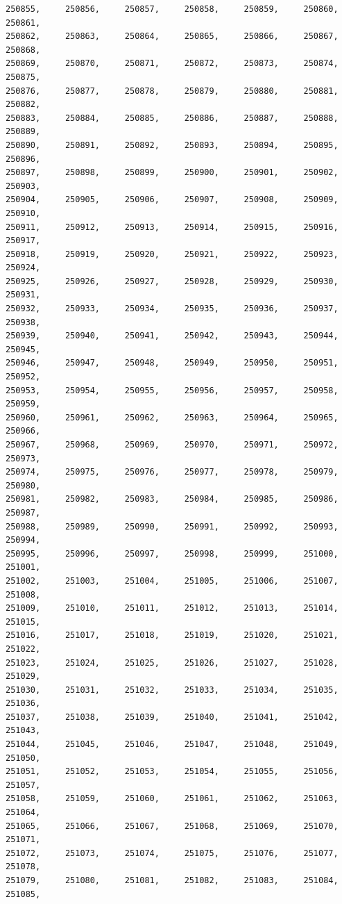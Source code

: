 \documentclass[a4paper,11pt]{report}
\begin{document}
\begin{verbatim}
250855,     250856,     250857,     250858,     250859,     250860,     250861,
250862,     250863,     250864,     250865,     250866,     250867,     250868,
250869,     250870,     250871,     250872,     250873,     250874,     250875,
250876,     250877,     250878,     250879,     250880,     250881,     250882,
250883,     250884,     250885,     250886,     250887,     250888,     250889,
250890,     250891,     250892,     250893,     250894,     250895,     250896,
250897,     250898,     250899,     250900,     250901,     250902,     250903,
250904,     250905,     250906,     250907,     250908,     250909,     250910,
250911,     250912,     250913,     250914,     250915,     250916,     250917,
250918,     250919,     250920,     250921,     250922,     250923,     250924,
250925,     250926,     250927,     250928,     250929,     250930,     250931,
250932,     250933,     250934,     250935,     250936,     250937,     250938,
250939,     250940,     250941,     250942,     250943,     250944,     250945,
250946,     250947,     250948,     250949,     250950,     250951,     250952,
250953,     250954,     250955,     250956,     250957,     250958,     250959,
250960,     250961,     250962,     250963,     250964,     250965,     250966,
250967,     250968,     250969,     250970,     250971,     250972,     250973,
250974,     250975,     250976,     250977,     250978,     250979,     250980,
250981,     250982,     250983,     250984,     250985,     250986,     250987,
250988,     250989,     250990,     250991,     250992,     250993,     250994,
250995,     250996,     250997,     250998,     250999,     251000,     251001,
251002,     251003,     251004,     251005,     251006,     251007,     251008,
251009,     251010,     251011,     251012,     251013,     251014,     251015,
251016,     251017,     251018,     251019,     251020,     251021,     251022,
251023,     251024,     251025,     251026,     251027,     251028,     251029,
251030,     251031,     251032,     251033,     251034,     251035,     251036,
251037,     251038,     251039,     251040,     251041,     251042,     251043,
251044,     251045,     251046,     251047,     251048,     251049,     251050,
251051,     251052,     251053,     251054,     251055,     251056,     251057,
251058,     251059,     251060,     251061,     251062,     251063,     251064,
251065,     251066,     251067,     251068,     251069,     251070,     251071,
251072,     251073,     251074,     251075,     251076,     251077,     251078,
251079,     251080,     251081,     251082,     251083,     251084,     251085,

\end{verbatim}
\end{document}
